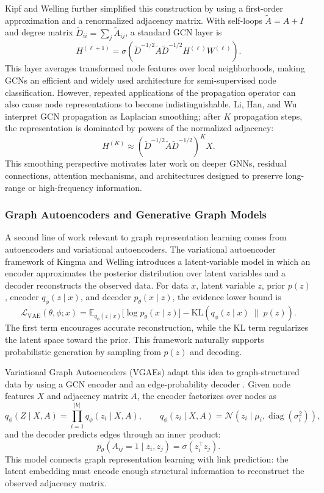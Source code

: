 \documentclass[11pt]{article}
\theoremstyle{definition}
\begin{document}
Kipf and Welling \cite{kipf2017semi} further simplified this construction by using a first-order approximation and a renormalized adjacency matrix. With self-loops $\widetilde{A}=A+I$ and degree matrix $\widetilde{D}_{ii}=\sum_j \widetilde{A}_{ij}$, a standard GCN layer is
\[
    H^{(\ell+1)}
    = \sigma\!\left(
        \widetilde{D}^{-1/2}\widetilde{A}\widetilde{D}^{-1/2}
        H^{(\ell)}W^{(\ell)}
      \right).
\]
This layer averages transformed node features over local neighborhoods, making GCNs an efficient and widely used architecture for semi-supervised node classification. However, repeated applications of the propagation operator can also cause node representations to become indistinguishable. Li, Han, and Wu \cite{li2018deeper} interpret GCN propagation as Laplacian smoothing; after $K$ propagation steps, the representation is dominated by powers of the normalized adjacency:
\[
    H^{(K)} \approx
    \left(\widetilde{D}^{-1/2}\widetilde{A}\widetilde{D}^{-1/2}\right)^K X.
\]
This smoothing perspective motivates later work on deeper GNNs, residual connections, attention mechanisms, and architectures designed to preserve long-range or high-frequency information.

\subsubsection{Graph Autoencoders and Generative Graph Models}
A second line of work relevant to graph representation learning comes from autoencoders and variational autoencoders. The variational autoencoder framework of Kingma and Welling \cite{kingma2014autoencoding} introduces a latent-variable model in which an encoder approximates the posterior distribution over latent variables and a decoder reconstructs the observed data. For data $x$, latent variable $z$, prior $p(z)$, encoder $q_\phi(z\mid x)$, and decoder $p_\theta(x\mid z)$, the evidence lower bound is
\[
    \mathcal{L}_{\mathrm{VAE}}(\theta,\phi;x)
    = \mathbb{E}_{q_\phi(z\mid x)}\big[\log p_\theta(x\mid z)\big]
      - \mathrm{KL}\!\left(q_\phi(z\mid x)\;\|\;p(z)\right).
\]
The first term encourages accurate reconstruction, while the KL term regularizes the latent space toward the prior. This framework naturally supports probabilistic generation by sampling from $p(z)$ and decoding.

Variational Graph Autoencoders (VGAEs) adapt this idea to graph-structured data by using a GCN encoder and an edge-probability decoder \cite{kipf2016variational}. Given node features $X$ and adjacency matrix $A$, the encoder factorizes over nodes as
\[
    q_\phi(Z\mid X,A)
    = \prod_{i=1}^{|V|} q_\phi(z_i\mid X,A),
    \qquad
    q_\phi(z_i\mid X,A)
    = \mathcal{N}\!\left(z_i\mid \mu_i,\operatorname{diag}(\sigma_i^2)\right),
\]
and the decoder predicts edges through an inner product:
\[
    p_\theta(A_{ij}=1\mid z_i,z_j)
    = \sigma(z_i^\top z_j).
\]
This model connects graph representation learning with link prediction: the latent embedding must encode enough structural information to reconstruct the observed adjacency matrix.
\end{document}

